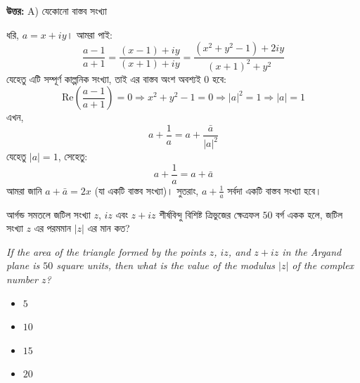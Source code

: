 \documentclass[12pt, a4paper]{article}
\begin{document}
\vspace{0.5em}
\begin{tcolorbox}[answerbox]
    \textbf{\color{success} উত্তর:} A) যেকোনো বাস্তব সংখ্যা
\end{tcolorbox}
\vspace{1em}

\begin{tcolorbox}[solutionbox={সমাধান (Solution)}]
    \noindent
    ধরি, $a = x + iy$। আমরা পাই:
    \[ \frac{a-1}{a+1} = \frac{(x-1) + iy}{(x+1) + iy} = \frac{(x^2 + y^2 - 1) + 2iy}{(x+1)^2 + y^2} \]
    যেহেতু এটি সম্পূর্ণ কাল্পনিক সংখ্যা, তাই এর বাস্তব অংশ অবশ্যই $0$ হবে:
    \[ \text{Re}\left(\frac{a-1}{a+1}\right) = 0 \Rightarrow x^2 + y^2 - 1 = 0 \Rightarrow |a|^2 = 1 \Rightarrow |a| = 1 \]
    এখন,
    \[ a + \frac{1}{a} = a + \frac{\bar{a}}{|a|^2} \]
    যেহেতু $|a| = 1$, সেহেতু:
    \[ a + \frac{1}{a} = a + \bar{a} \]
    আমরা জানি $a + \bar{a} = 2x$ (যা একটি বাস্তব সংখ্যা)। 
    সুতরাং, $a + \frac{1}{a}$ সর্বদা একটি বাস্তব সংখ্যা হবে।
\end{tcolorbox}


\begin{tcolorbox}[questionbox={প্রশ্ন (Question) 3}]
    \noindent
    আর্গন্ড সমতলে জটিল সংখ্যা $z$, $iz$ এবং $z + iz$ শীর্ষবিন্দু বিশিষ্ট ত্রিভুজের ক্ষেত্রফল $50$ বর্গ একক হলে, জটিল সংখ্যা $z$ এর পরমমান $|z|$ এর মান কত?
    
    \vspace{0.8em}
    \begin{english}
    \noindent\textit{\color{darkgray}
    If the area of the triangle formed by the points $z$, $iz$, and $z + iz$ in the Argand plane is $50$ square units, then what is the value of the modulus $|z|$ of the complex number $z$?
    }
    \end{english}
\end{tcolorbox}

\begin{itemize}[label={}, leftmargin=1cm, itemsep=0.5em]
    \item[\textbf{A)}] $5$
    \item[\textbf{B)}] $10$
    \item[\textbf{C)}] $15$
    \item[\textbf{D)}] $20$
\end{itemize}
\end{document}

